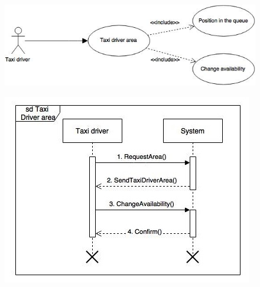 \documentclass[18pt,oneside,a4paper, titlepage]{article}
\begin{document}
\begin{itemize}
\begin{center}
					\begin{figure}[h]
						\centering
						\includegraphics[scale=0.7]{Diagrams/UseCaseTaxiArea.jpg}
					\end{figure}
				\end{center}
			
				\newpage
				
				\begin{figure}[h]
					\centering
					\includegraphics[scale=1]{Diagrams/SequenceTaxiArea.jpg}
				\end{figure}
	\end{itemize}
\newpage
\end{document}

